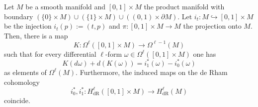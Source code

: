 \begin{theorem}
  Let $M$ be a smooth manifold and $[0,1]\times M$ the product manifold with boundary $(\{0\}\times M) \cup (\{1\}\times M) \cup ((0,1)\times\partial M)$.
  Let $i_t : M \hookrightarrow [0,1]\times M$ be the injection $i_t(p) := (t,p)$ and $\pi : [0,1]\times M \to M$ the projection onto $M$.
  Then, there is a map
  \begin{equation}
    K : \Omega^\ell([0,1]\times M)\to \Omega^{\ell-1}(M)
  \end{equation}
  such that for every differential $\ell$-form $\omega\in\Omega^\ell([0,1]\times M)$ one has
  \begin{equation}
    K(d\omega) + d(K(\omega)) = i^*_1(\omega) - i^*_0(\omega)
  \end{equation}
  as elements of $\Omega^\ell(M)$.
  Furthermore, the induced maps on the de Rham cohomology
  \begin{equation}
    i_0^*, i_1^* : H_{\mathrm{dR}}^\ell([0,1]\times M) \to H_{\mathrm{dR}}^\ell(M)
  \end{equation}
  coincide.
\end{theorem}
